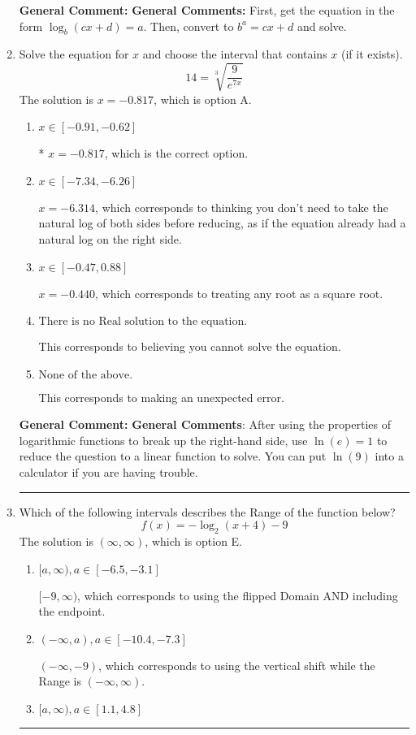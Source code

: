 \documentclass{extbook}[14pt]
\newcommand{\litem}[1]{\item #1

\rule{\textwidth}{0.4pt}}
\begin{document}
\begin{enumerate}
{\textbf{General Comment:} \textbf{General Comments:} First, get the equation in the form $\log_b{(cx+d)} = a$. Then, convert to $b^a = cx+d$ and solve.
}
\litem{
 Solve the equation for $x$ and choose the interval that contains $x$ (if it exists).
\[  14 = \sqrt[3]{\frac{9}{e^{7x}}} \]The solution is \( x = -0.817 \), which is option A.\begin{enumerate}[label=\Alph*.]
\item \( x \in [-0.91, -0.62] \)

* $x = -0.817$, which is the correct option.
\item \( x \in [-7.34, -6.26] \)

$x = -6.314$, which corresponds to thinking you don't need to take the natural log of both sides before reducing, as if the equation already had a natural log on the right side.
\item \( x \in [-0.47, 0.88] \)

$x = -0.440$, which corresponds to treating any root as a square root.
\item \( \text{There is no Real solution to the equation.} \)

This corresponds to believing you cannot solve the equation.
\item \( \text{None of the above.} \)

This corresponds to making an unexpected error.
\end{enumerate}

\textbf{General Comment:} \textbf{General Comments}: After using the properties of logarithmic functions to break up the right-hand side, use $\ln(e) = 1$ to reduce the question to a linear function to solve. You can put $\ln(9)$ into a calculator if you are having trouble.
}
\litem{
Which of the following intervals describes the Range of the function below?
\[ f(x) = -\log_2{(x+4)}-9 \]The solution is \( (\infty, \infty) \), which is option E.\begin{enumerate}[label=\Alph*.]
\item \( [a, \infty), a \in [-6.5, -3.1] \)

$[-9, \infty)$, which corresponds to using the flipped Domain AND including the endpoint.
\item \( (-\infty, a), a \in [-10.4, -7.3] \)

$(-\infty, -9)$, which corresponds to using the vertical shift while the Range is $(-\infty, \infty)$.
\item \( [a, \infty), a \in [1.1, 4.8] \)


\end{enumerate}}
\end{enumerate}
\end{document}
